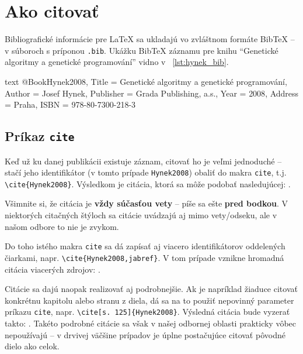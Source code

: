 \chapter{Ako citovať}

Bibliografické informácie pre LaTeX sa ukladajú vo zvláštnom formáte BibTeX -- v súboroch s príponou \texttt{.bib}. Ukážku BibTeX záznamu pre knihu \enquote{Genetické algoritmy a genetické programování} vidno v \listingname~\ref{lst:hynek_bib}.

\begin{inlinecode}[label={lst:hynek_bib},caption={Ukážka BibTeX záznamu.},breaklines]{text}
@Book{Hynek2008,
  Title                    = {Genetické algoritmy a genetické programování},
  Author                   = {Josef Hynek},
  Publisher                = {Grada Publishing, a.s.},
  Year                     = {2008},
  Address                  = {Praha},
  ISBN                     = {978-80-7300-218-3}
}
\end{inlinecode}

\section{Príkaz \texttt{cite}}

Keď už ku danej publikácii existuje záznam, citovať ho je veľmi jednoduché -- stačí jeho identifikátor (v tomto prípade \texttt{Hynek2008}) obaliť do makra \texttt{cite}, t.j. \texttt{{\textbackslash}cite\{Hynek2008\}}. Výsledkom je citácia, ktorá sa môže podobať nasledujúcej: \cite{Hynek2008}.

Všimnite si, že citácia je \textbf{vždy súčasťou vety} -- píše sa ešte \textbf{pred bodkou}. V niektorých citačných štýloch sa citácie uvádzajú aj mimo vety/odseku, ale v našom odbore to nie je zvykom.

Do toho istého makra \texttt{cite} sa dá zapísať aj viacero identifikátorov oddelených čiarkami, napr. \texttt{{\textbackslash}cite\{Hynek2008,jabref\}}. V tom prípade vznikne hromadná citácia viacerých zdrojov: \cite{Hynek2008,jabref}.

Citácie sa dajú naopak realizovať aj podrobnejšie. Ak je napríklad žiaduce citovať konkrétnu kapitolu alebo stranu z diela, dá sa na to použiť nepovinný parameter príkazu \texttt{cite}, napr. \texttt{{\textbackslash}cite[s. 125]\{Hynek2008\}}. Výsledná citácia bude vyzerať takto: \cite[s. 125]{Hynek2008}. Takéto podrobné citácie sa však v našej odbornej oblasti prakticky vôbec nepoužívajú -- v drvivej väčšine prípadov je úplne postačujúce citovať pôvodné dielo ako celok.

